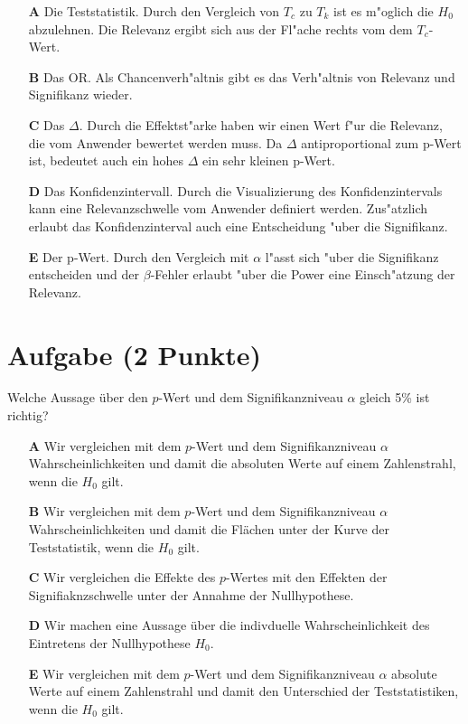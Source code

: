 \documentclass[a4paper, 10pt]{scrartcl}\usepackage[]{graphicx}\usepackage[]{xcolor}
\begin{document}
\begin{enumerate}
\item [\textbf{A} \msquare] Die Teststatistik. Durch den Vergleich von $T_c$ zu $T_k$ ist es m{"o}glich die $H_0$ abzulehnen. Die Relevanz ergibt sich aus der Fl{"a}che rechts vom dem $T_c$-Wert.
\item [\textbf{B} \msquare] Das OR. Als Chancenverh{"a}ltnis gibt es das Verh{"a}ltnis von Relevanz und Signifikanz wieder.
\item [\textbf{C} \msquare] Das $\Delta$. Durch die Effektst{"a}rke haben wir einen Wert f{"u}r die Relevanz, die vom Anwender bewertet werden muss. Da $\Delta$ antiproportional zum p-Wert ist, bedeutet auch ein hohes $\Delta$ ein sehr kleinen p-Wert.
\item [\textbf{D} \msquare] Das Konfidenzintervall. Durch die Visualizierung des Konfidenzintervals kann eine Relevanzschwelle vom Anwender definiert werden. Zus{"a}tzlich erlaubt das Konfidenzinterval auch eine Entscheidung {"u}ber die Signifikanz.
\item [\textbf{E} \msquare] Der p-Wert. Durch den Vergleich mit $\alpha$ l{"a}sst sich {"u}ber die Signifikanz entscheiden und der $\beta$-Fehler erlaubt {"u}ber die Power eine Einsch{"a}tzung der Relevanz.
\end{enumerate}

\section{Aufgabe \hfill (2 Punkte)}

Welche Aussage über den $p$-Wert und dem Signifikanzniveau $\alpha$ gleich 5\% ist richtig?



\begin{enumerate}
\item [\textbf{A} \msquare] Wir vergleichen mit dem $p$-Wert und dem Signifikanzniveau $\alpha$ Wahrscheinlichkeiten und damit die absoluten Werte auf einem Zahlenstrahl, wenn die $H_0$ gilt.
\item [\textbf{B} \msquare] Wir vergleichen mit dem $p$-Wert und dem Signifikanzniveau $\alpha$ Wahrscheinlichkeiten und damit die Flächen unter der Kurve der Teststatistik, wenn die $H_0$ gilt.
\item [\textbf{C} \msquare] Wir vergleichen die Effekte des $p$-Wertes mit den Effekten der Signifiaknzschwelle unter der Annahme der Nullhypothese.
\item [\textbf{D} \msquare] Wir machen eine Aussage über die indivduelle Wahrscheinlichkeit des Eintretens der Nullhypothese $H_0$.
\item [\textbf{E} \msquare] Wir vergleichen mit dem $p$-Wert und dem Signifikanzniveau $\alpha$ absolute Werte auf einem Zahlenstrahl und damit den Unterschied der Teststatistiken, wenn die $H_0$ gilt.
\end{enumerate}
\end{document}
